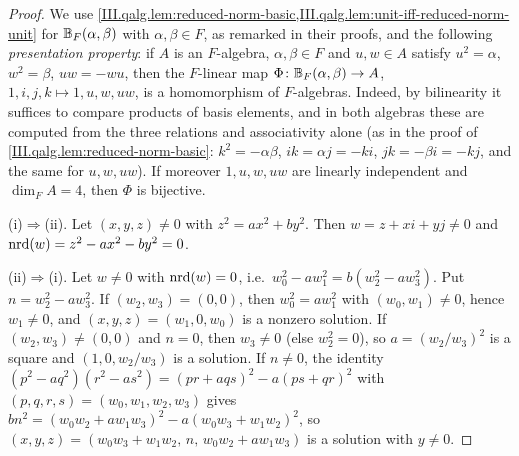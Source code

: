 \begin{theorem}
\end{theorem}
\begin{proof}
We use \cref{III.qalg.lem:reduced-norm-basic,III.qalg.lem:unit-iff-reduced-norm-unit} for $\mathbb{B}_F(\alpha,\beta)$ with $\alpha,\beta\in F$, as
remarked in their proofs, and the following \emph{presentation property}: if $A$ is an $F$-algebra, $\alpha,\beta\in F$ and $u,w\in A$ satisfy
$u^2=\alpha$, $w^2=\beta$, $uw=-wu$, then the $F$-linear map $\Phi\colon\mathbb{B}_F(\alpha,\beta)\to A$, $1,i,j,k\mapsto1,u,w,uw$, is a homomorphism of
$F$-algebras. Indeed, by bilinearity it suffices to compare products of basis elements, and in both algebras these are computed from the three
relations and associativity alone (as in the proof of \cref{III.qalg.lem:reduced-norm-basic}: $k^2=-\alpha\beta$, $ik=\alpha j=-ki$,
$jk=-\beta i=-kj$, and the same for $u,w,uw$). If moreover $1,u,w,uw$ are linearly independent and $\dim_FA=4$, then $\Phi$ is bijective.

(i)$\Rightarrow$(ii). Let $(x,y,z)\ne0$ with $z^2=ax^2+by^2$. Then $w=z+xi+yj\ne0$ and $\operatorname{nrd}(w)=z^2-ax^2-by^2=0$.

(ii)$\Rightarrow$(i). Let $w\ne0$ with $\operatorname{nrd}(w)=0$, i.e.\ $w_0^2-aw_1^2=b(w_2^2-aw_3^2)$. Put $n=w_2^2-aw_3^2$.
If $(w_2,w_3)=(0,0)$, then $w_0^2=aw_1^2$ with $(w_0,w_1)\ne0$, hence $w_1\ne0$, and $(x,y,z)=(w_1,0,w_0)$ is a nonzero solution.
If $(w_2,w_3)\ne(0,0)$ and $n=0$, then $w_3\ne0$ (else $w_2^2=0$), so $a=(w_2/w_3)^2$ is a square and $(1,0,w_2/w_3)$ is a solution.
If $n\ne0$, the identity $(p^2-aq^2)(r^2-as^2)=(pr+aqs)^2-a(ps+qr)^2$ with $(p,q,r,s)=(w_0,w_1,w_2,w_3)$ gives
$bn^2=(w_0w_2+aw_1w_3)^2-a(w_0w_3+w_1w_2)^2$, so $(x,y,z)=(w_0w_3+w_1w_2,\,n,\,w_0w_2+aw_1w_3)$ is a solution with $y\ne0$.


\end{proof}
